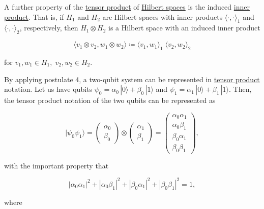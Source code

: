 \documentclass{article}
\newcounter{example}[section]
\begin{document}
    A further property of the \hyperref[sm-def:tensor-product]{tensor product} of \hyperref[fa-def:hilbert-space]{Hilbert spaces} is the induced \hyperref[lin-def:inner-product]{inner product}. That is, if $H_1$ and $H_2$ are Hilbert spaces with inner products $\langle \cdot, \cdot \rangle_1$ and $\langle \cdot, \cdot \rangle_2$, respectively, then $H_1 \otimes H_2$ is a Hilbert space with an induced inner product

      \begin{equation}
        \langle v_1 \otimes v_2 , w_1 \otimes w_2 \rangle \coloneqq \langle v_1, w_1\rangle_1 \; \langle v_2, w_2 \rangle_2
      \end{equation}

    for $v_1, w_1 \in H_1, \; v_2, w_2 \in H_2$. 

    \begin{example}
      \label{ex:two-qubit-system}
      By applying postulate 4, a two-qubit system can be represented in \hyperref[sm-def:tensor-product]{tensor product} notation. Let us have qubits $\psi_0 = \alpha_0 \, |0\rangle + \beta_0 \, |1\rangle$ and $\psi_1 = \alpha_1 \, |0\rangle + \beta_1 \, |1\rangle$. Then, the tensor product notation of the two qubits can be represented as

        \begin{equation}
          |\psi_0 \psi_1 \rangle = \begin{pmatrix} \alpha_0 \\ \beta_0 \end{pmatrix} \otimes \begin{pmatrix} \alpha_1 \\ \beta_1 \end{pmatrix} = \begin{pmatrix} \alpha_0 \alpha_1 \\ \alpha_0 \beta_1 \\ \beta_0 \alpha_1 \\ \beta_0 \beta_1 \end{pmatrix},
        \end{equation}

      with the important property that

        \begin{equation}
          |\alpha_0 \alpha_1|^2 + |\alpha_0 \beta_1|^2 + |\beta_0 \alpha_1|^2 + |\beta_0 \beta_1|^2 = 1,
        \end{equation}

      where


\end{example}
\end{document}
